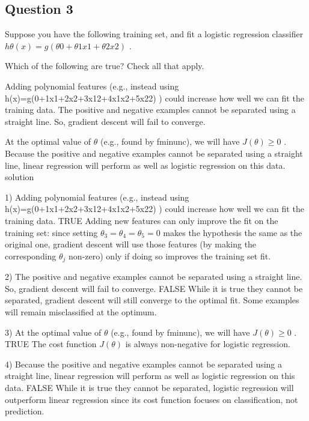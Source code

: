 \documentclass[11pt]{article} %
\begin{document}



\subsection{Question 3}

Suppose you have the following training set, and fit a logistic regression classifier $h\theta(x)=g(\theta0+\theta1x1+\theta2x2)$ .

Which of the following are true? Check all that apply. 



Adding polynomial features (e.g., instead using h(x)=g(0+1x1+2x2+3x12+4x1x2+5x22) ) could increase how well we can fit the training data.  
The positive and negative examples cannot be separated using a straight line. So, gradient descent will fail to converge.

At the optimal value of $\theta$ (e.g., found by fminunc), we will have $ J(\theta) \geq $0 . 
Because the positive and negative examples cannot be separated using a straight line, linear regression will perform as well as logistic regression on this data.
solution

1)
Adding polynomial features (e.g., instead using h(x)=g(0+1x1+2x2+3x12+4x1x2+5x22) ) could increase how well we can fit the training data.  
TRUE
Adding new features can only improve the fit on the training set: since setting $\theta_3=\theta_4=\theta_5=0$ makes the hypothesis the same as the original one, gradient descent will use those features (by making the corresponding $\theta_j$ non-zero) only if doing so improves the training set fit. 

2)
The positive and negative examples cannot be separated using a straight line. So, gradient descent will fail to converge. 
FALSE
While it is true they cannot be separated, gradient descent will still converge to the optimal fit. Some examples will remain misclassified at the optimum. 



3)
At the optimal value of $\theta$ (e.g., found by fminunc), we will have $ J(\theta) \geq$0 . 
TRUE
The cost function $ J(\theta)$ is always non-negative for logistic regression. 

4)
Because the positive and negative examples cannot be separated using a straight line, linear regression will perform as well as logistic regression on this data. 
FALSE
While it is true they cannot be separated, logistic regression will outperform linear regression since its cost function focuses on classification, not prediction. 
\end{document}
